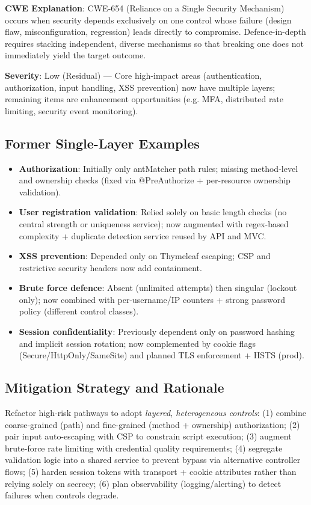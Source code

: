 \documentclass[]{UCD_CS_FYP_Report}
\begin{document}
	\textbf{CWE Explanation}: CWE-654 (Reliance on a Single Security Mechanism) occurs when security depends exclusively on one control whose failure (design flaw, misconfiguration, regression) leads directly to compromise. Defence-in-depth requires stacking independent, diverse mechanisms so that breaking one does not immediately yield the target outcome.

	\textbf{Severity}: Low (Residual) — Core high-impact areas (authentication, authorization, input handling, XSS prevention) now have multiple layers; remaining items are enhancement opportunities (e.g. MFA, distributed rate limiting, security event monitoring).

\subsection*{Former Single-Layer Examples}
\begin{itemize}
	\item \textbf{Authorization}: Initially only antMatcher path rules; missing method-level and ownership checks (fixed via @PreAuthorize + per-resource ownership validation).
	\item \textbf{User registration validation}: Relied solely on basic length checks (no central strength or uniqueness service); now augmented with regex-based complexity + duplicate detection service reused by API and MVC.
	\item \textbf{XSS prevention}: Depended only on Thymeleaf escaping; CSP and restrictive security headers now add containment.
	\item \textbf{Brute force defence}: Absent (unlimited attempts) then singular (lockout only); now combined with per-username/IP counters + strong password policy (different control classes).
	\item \textbf{Session confidentiality}: Previously dependent only on password hashing and implicit session rotation; now complemented by cookie flags (Secure/HttpOnly/SameSite) and planned TLS enforcement + HSTS (prod).
\end{itemize}

\subsection*{Mitigation Strategy and Rationale}
Refactor high-risk pathways to adopt \textit{layered, heterogeneous controls}: (1) combine coarse-grained (path) and fine-grained (method + ownership) authorization; (2) pair input auto-escaping with CSP to constrain script execution; (3) augment brute-force rate limiting with credential quality requirements; (4) segregate validation logic into a shared service to prevent bypass via alternative controller flows; (5) harden session tokens with transport + cookie attributes rather than relying solely on secrecy; (6) plan observability (logging/alerting) to detect failures when controls degrade.
\end{document}
